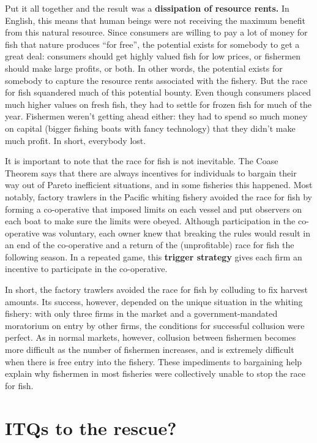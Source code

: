 %
Put it all together and the result was a \textbf{dissipation of resource rents.} In English, this means that human beings were not receiving the maximum benefit from this natural resource. Since consumers are willing to pay a lot of money for fish that nature produces ``for free'', the potential exists for somebody to get a great deal: consumers should get highly valued fish for low prices, or fishermen should make large profits, or both. In other words, the potential exists for somebody to capture the resource rents associated with the fishery. But the race for fish squandered much of this potential bounty. Even though consumers placed much higher values on fresh fish, they had to settle for frozen fish for much of the year. Fishermen weren't getting ahead either: they had to spend so much money on capital (bigger fishing boats with fancy technology) that they didn't make much profit. In short, everybody lost.

It is important to note that the race for fish is not inevitable. The Coase Theorem says that there are always incentives for individuals to bargain their way out of Pareto inefficient situations, and in some fisheries this happened. Most notably, factory trawlers in the Pacific whiting fishery avoided the race for fish by forming a co-operative that imposed limits on each vessel and put observers on each boat to make sure the limits were obeyed. Although participation in the co-operative was voluntary, each owner knew that breaking the rules would result in an end of the co-operative and a return of the (unprofitable) race for fish the following season. In a repeated game, this \textbf{trigger strategy} gives each firm an incentive to participate in the co-operative.

In short, the factory trawlers avoided the race for fish by colluding to fix harvest amounts. Its success, however, depended on the unique situation in the whiting fishery: with only three firms in the market and a government-mandated moratorium on entry by other firms, the conditions for successful collusion were perfect. As in normal markets, however, collusion between fishermen becomes more difficult as the number of fishermen increases, and is extremely difficult when there is free entry into the fishery. These impediments to bargaining help explain why fishermen in most fisheries were collectively unable to stop the race for fish.



\section{ITQs to the rescue?}

